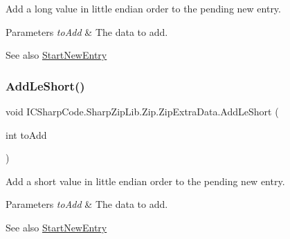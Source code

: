 Add a long value in little endian order to the pending new entry. 


\begin{DoxyParams}{Parameters}
{\em to\+Add} & The data to add.\\
\hline
\end{DoxyParams}
\begin{DoxySeeAlso}{See also}
\hyperlink{class_i_c_sharp_code_1_1_sharp_zip_lib_1_1_zip_1_1_zip_extra_data_a3fd5ac216b1b6a0fe5ae92ea8156f20a}{Start\+New\+Entry}


\end{DoxySeeAlso}
\mbox{\label{class_i_c_sharp_code_1_1_sharp_zip_lib_1_1_zip_1_1_zip_extra_data_acc356859af6fe44b71ca605473385dec}} 
\subsubsection{\texorpdfstring{Add\+Le\+Short()}{AddLeShort()}\hspace{0.1cm}{\footnotesize\ttfamily [1/2]}}
{\footnotesize\ttfamily void I\+C\+Sharp\+Code.\+Sharp\+Zip\+Lib.\+Zip.\+Zip\+Extra\+Data.\+Add\+Le\+Short (\begin{DoxyParamCaption}\item[{int}]{to\+Add }\end{DoxyParamCaption})\hspace{0.3cm}{\ttfamily [inline]}}



Add a short value in little endian order to the pending new entry. 


\begin{DoxyParams}{Parameters}
{\em to\+Add} & The data to add.\\
\hline
\end{DoxyParams}
\begin{DoxySeeAlso}{See also}
\hyperlink{class_i_c_sharp_code_1_1_sharp_zip_lib_1_1_zip_1_1_zip_extra_data_a3fd5ac216b1b6a0fe5ae92ea8156f20a}{Start\+New\+Entry}


\end{DoxySeeAlso}
\mbox{\label{class_i_c_sharp_code_1_1_sharp_zip_lib_1_1_zip_1_1_zip_extra_data_acc356859af6fe44b71ca605473385dec}} 

